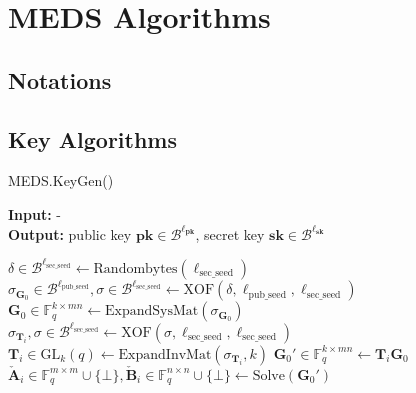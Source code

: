 \chapter{MEDS Algorithms}
\label{app:medsalgs}

\section{Notations}

\section{Key Algorithms}
\begin{algorithm}[H]
\caption{MEDS.KeyGen()}\label{alg:medskeygen}
\hspace*{\algorithmicindent} \textbf{Input:} -\\
\hspace*{\algorithmicindent} \textbf{Output:} public key $\textbf{pk} \in \mathcal{B}^{\ell_\textbf{pk}}$, secret key $\textbf{sk} \in \mathcal{B}^{\ell_\textbf{sk}}$
\begin{algorithmic}[1]
\State $\delta \in \mathcal{B}^{\ell_\text{sec\_seed}} \gets \text{Randombytes}(\ell_\text{sec\_seed})$
\State $\sigma_{\textbf{G}_0} \in \mathcal{B}^{\ell_\text{pub\_seed}}, \sigma \in \mathcal{B}^{\ell_\text{sec\_seed}} \gets \text{XOF}(\delta, \ell_\text{pub\_seed}, \ell_\text{sec\_seed})$
\State $\textbf{G}_0 \in \mathds{F}_q^{k \times mn} \gets \text{ExpandSysMat}(\sigma_{\textbf{G}_0})$
    \State $\sigma_{\textbf{T}_i}, \sigma \in \mathcal{B}^{\ell_\text{sec\_seed}} \gets \text{XOF}(\sigma, \ell_\text{sec\_seed}, \ell_\text{sec\_seed})$
    \State $\textbf{T}_i \in \text{GL}_k(q) \gets \text{ExpandInvMat}(\sigma_{\textbf{T}_i}, k)$
    \State $\textbf{G}_0' \in \mathds{F}_q^{k \times mn} \gets \textbf{T}_i \textbf{G}_0$
    \State $\check{\textbf{A}}_i \in \mathds{F}_q^{m \times m} \cup \{\bot\}, \check{\textbf{B}}_i \in \mathds{F}_q^{n \times n} \cup \{\bot\} \gets \text{Solve}(\textbf{G}_0')$

\end{algorithmic}
\end{algorithm}
